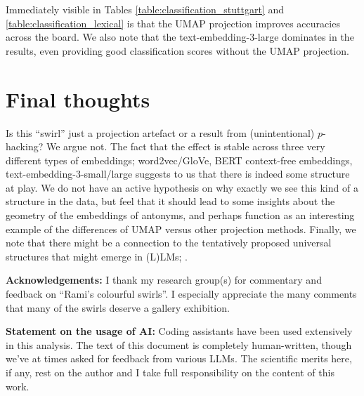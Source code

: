 \documentclass[a4paper]{article}
\theoremstyle{definition}
\theoremstyle{remark}
\numberwithin{equation}{section}
\begin{document}
Immediately visible in Tables \ref{table:classification_stuttgart} and \ref{table:classification_lexical} is that the UMAP projection improves accuracies across the board. We also note that the text-embedding-3-large dominates in the results, even providing good classification scores without the UMAP projection.


\section{Final thoughts}

Is this ``swirl'' just a projection artefact or a result from (unintentional) $p$-hacking? We argue not. The fact that the effect is stable across three very different types of embeddings; word2vec/GloVe, BERT context-free embeddings, text-embedding-3-small/large suggests to us that there is indeed some structure at play. We do not have an active hypothesis on why exactly we see this kind of a structure in the data, but feel that it should lead to some insights about the geometry of the embeddings of antonyms, and perhaps function as an interesting example of the differences of UMAP versus other projection methods.
Finally, we note that there might be a connection to the tentatively proposed universal structures that might emerge in (L)LMs; \cite{huh2024platonic,jha2025harnessing}.


\bigskip

\textbf{Acknowledgements:} I thank my research group(s) for commentary and feedback on ``Rami's colourful swirls''. I especially appreciate the many comments that many of the swirls deserve a gallery exhibition.


\bigskip

\textbf{Statement on the usage of AI:} Coding assistants have been used extensively in this analysis. The text of this document is completely human-written, though we've at times asked for feedback from various LLMs. The scientific merits here, if any, rest on the author and I take full responsibility on the content of this work.




\label{lastpage}
\end{document}
